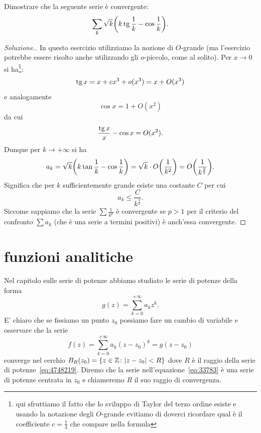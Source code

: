 \begin{exercise}
  Dimostrare che la seguente serie è convergente:
  \[
    \sum_k \sqrt{k} {\left( k\operatorname{tg}{\frac 1 k} - \cos \frac 1 k \right)}.
  \]
\end{exercise}
\begin{proof}[Soluzione.]
In questo esercizio utilizziamo la nozione di $O$-grande (ma l'esercizio potrebbe essere risolto anche utilizzando gli $o$-piccolo, come al solito).
Per $x\to 0$ si ha\footnote{qui sfruttiamo il fatto che lo sviluppo di Taylor del terzo ordine esiste e usando la notazione degli $O$-grande evitiamo di doverci ricordare qual è il coefficiente $c=\frac 1 3$ che compare nella formula}:
\[
  \operatorname{tg} x = x + c x^3 + o(x^3) = x + O(x^3)
\]
e analogamente
\[
  \cos x = 1 + O(x^2)
\]
da cui
\[
  \frac{\operatorname{tg} x}{x} - \cos x = O(x^2).
\]
Dunque per $k\to +\infty$ si ha
\[
  a_k = \sqrt{k} {\left( k\tan{\frac 1 k} - \cos \frac 1 k \right)}
   = \sqrt{k} \cdot O{\left( \frac 1 {k^2} \right)} = O{\left( \frac 1 {k^{\frac 3 2}} \right)}.
\]
Significa che per $k$ sufficientemente grande esiste una costante $C$
per cui
\[
  a_k \le \frac{C}{k^{\frac 3 2}}.
\]
Siccome sappiamo che la serie $\sum \frac{1}{k^p}$ è convergente
se $p>1$ per il criterio del confronto $\sum a_k$ (che è una serie a termini positivi) è anch'essa convergente.
\end{proof}


\section{funzioni analitiche}


Nel capitolo sulle serie di potenze abbiamo studiato le serie di potenze
della forma
\begin{equation}\label{eq:4748219}
    g(z) = \sum_{k=0}^{+\infty} a_k z^k.
\end{equation}
E' chiaro che se fissiamo un punto $z_0$ possiamo fare un cambio di variabile
e osservare che la serie
\begin{equation}\label{eq:33783}
  f(z) = \sum_{k=0}^{+\infty} a_k (z-z_0)^k = g(z-z_0)
\end{equation}
converge nel cerchio $B_R(z_0) = {\left\{ z \in \mathbb Z\colon {\left|z-z_0\right|}< R \right\}}$
dove $R$ è il raggio della serie di potenze~\eqref{eq:4748219}.
Diremo che la serie nell'equazione~\eqref{eq:33783} è una
serie di potenze centrata in $z_0$ e chiameremo $R$ il suo raggio di convergenza.

